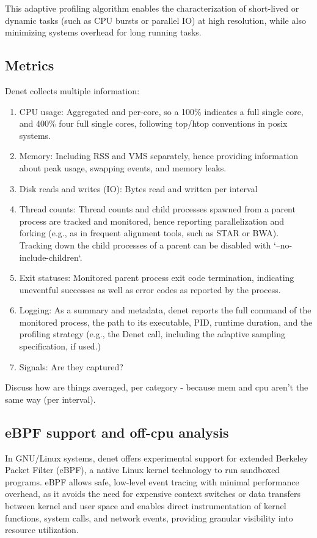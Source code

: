 \documentclass[10pt]{article}
\begin{document}
This adaptive profiling algorithm enables the characterization of short-lived or dynamic tasks (such as CPU bursts or parallel IO) at high resolution, while also minimizing systems overhead for long running tasks.

\subsection{Metrics}

Denet collects multiple information:

\begin{enumerate}
    \item CPU usage: Aggregated and per-core, so a 100\% indicates a full single core, and 400\% four full single cores, following top/htop conventions in posix systems.
    \item Memory: Including RSS and VMS separately, hence providing information about peak usage, swapping events, and memory leaks.
    \item Disk reads and writes (IO): Bytes read and written per interval
    \item Thread counts: Thread counts and child processes spawned from a parent process are tracked and monitored, hence reporting parallelization and forking (e.g., as in frequent alignment tools, such as STAR or BWA). Tracking down the child processes of a parent can be disabled with `--no-include-children`. 
    \item Exit statuses: Monitored parent process exit code termination, indicating uneventful successes as well as error codes as reported by the process.
    \item Logging: As a summary and metadata, denet reports the full command of the monitored process, the path to its executable, PID, runtime duration, and the profiling strategy (e.g., the Denet call, including the adaptive sampling specification, if used.)
    \item Signals: {\color{red}Are they captured?}
\end{enumerate}

{\color{red}Discuss how are things averaged, per category - because mem and cpu aren’t the same way (per interval).}

\subsection{eBPF support and off-cpu analysis}

In GNU/Linux systems, denet offers experimental support for extended Berkeley Packet Filter (eBPF), a native Linux kernel technology to run sandboxed programs. eBPF allows safe, low-level event tracing with minimal performance overhead, as it avoids the need for expensive context switches or data transfers between kernel and user space and enables direct instrumentation of kernel functions, system calls, and network events, providing granular visibility into resource utilization. 
\end{document}
